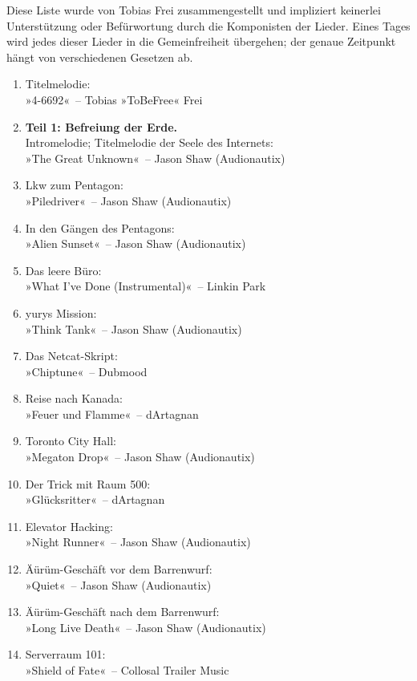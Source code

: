 Diese Liste wurde von Tobias Frei zusammengestellt und impliziert keinerlei Unterstützung oder Befürwortung durch die Komponisten der Lieder. Eines Tages wird jedes dieser Lieder in die Gemeinfreiheit übergehen; der genaue Zeitpunkt hängt von verschiedenen Gesetzen ab.

\begin{enumerate}
    \item Titelmelodie:\\ »4-6692«~– Tobias »ToBeFree« Frei
    \item \textbf{Teil 1: Befreiung der Erde.}\\ Intromelodie; Titelmelodie der Seele des Internets:\\ »The Great Unknown«~– Jason Shaw (Audionautix)
    \item Lkw zum Pentagon:\\ »Piledriver«~– Jason Shaw (Audionautix)
    \item In den Gängen des Pentagons:\\ »Alien Sunset«~– Jason Shaw (Audionautix)
    \item Das leere Büro:\\ »What I’ve Done (Instrumental)«~– Linkin Park
    \item yurys Mission:\\ »Think Tank«~– Jason Shaw (Audionautix)
    \item Das Netcat-Skript:\\ »Chiptune«~– Dubmood
    \item Reise nach Kanada:\\ »Feuer und Flamme«~– dArtagnan
    \item Toronto City Hall:\\ »Megaton Drop«~– Jason Shaw (Audionautix)
    \item Der Trick mit Raum 500:\\ »Glücksritter«~– dArtagnan
    \item Elevator Hacking:\\ »Night Runner«~– Jason Shaw (Audionautix)
    \item Äürüm-Geschäft vor dem Barrenwurf:\\ »Quiet«~– Jason Shaw (Audionautix)
    \item Äürüm-Geschäft nach dem Barrenwurf:\\ »Long Live Death«~– Jason Shaw (Audionautix)
    \item Serverraum 101:\\ »Shield of Fate«~– Collosal Trailer Music

\end{enumerate}
